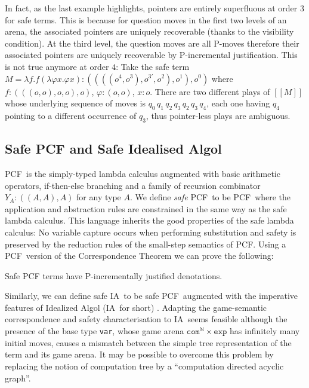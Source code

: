 \documentclass{llncs}
\newcommand\nat{\mathbb{N}}
\newcommand{\sem}[1]{{[\![ #1 ]\!]}}
\newcommand\ialgol{\textsf{IA}}
\newcommand\iacom{\texttt{com}}
\newcommand\iaexp{\texttt{exp}}
\newcommand\iavar{\texttt{var}}
\newcommand\pcf{\textsf{PCF}}
\begin{document}
In fact, as the last example highlights, pointers are entirely superfluous at 
order $3$ for safe terms. This is because for 
question moves in the first two levels of an arena, 
the associated pointers are uniquely recoverable (thanks to 
the visibility condition). At the third level, the question moves are all P-moves therefore their associated pointers are uniquely recoverable by
P-incremental justification. This is not true anymore at order $4$:
Take the safe term $M = \lambda f . f (\lambda \varphi x . \varphi x)
: ((((o^4,o^3),o^{3'},o^2),o^1),o^0)$ where $f:(((o,o),o,o),o)$,
$\varphi:(o,o)$, $x:o$. There are two different plays of $\sem{M}$
whose underlying sequence of moves is $q_0 \, q_1 \, q_2 \, q_3 \, q_2
\, q_3 \, q_4$, each one having $q_4$ pointing to a different
occurrence of $q_3$, thus pointer-less plays are ambiguous.

\subsection*{Safe PCF and Safe Idealised Algol}

\pcf\ is the simply-typed lambda calculus augmented with basic
arithmetic operators, if-then-else branching and a family of recursion
combinator $Y_A : ((A,A),A)$ for any type $A$.  We define \emph{safe}
\pcf\ to be \pcf\ where the application and abstraction rules are
constrained in the same way as the safe lambda calculus.  This
language inherits the good properties of the safe lambda calculus: No
variable capture occurs when performing substitution and safety is
preserved by the reduction rules of the small-step semantics of
\pcf. Using a \pcf\ version of the Correspondence Theorem we can prove
the following:
\begin{theorem}
\label{thm:safepcfpincr}
Safe PCF terms have P-incrementally justified denotations.
\end{theorem}

Similarly, we can define safe \ialgol\ to be safe \pcf\ augmented with
the imperative features of Idealized Algol (\ialgol\ for short)
\cite{Reynolds81}.  Adapting the game-semantic correspondence and
safety characterisation to \ialgol\ seems feasible although the
presence of the base type \iavar, whose game arena $\iacom^{\nat}
\times \iaexp$ has infinitely many initial moves, causes a mismatch
between the simple tree representation of the term and its game
arena. It may be possible to overcome this problem by replacing the
notion of computation tree by a ``computation directed acyclic
graph''.
\end{document}
